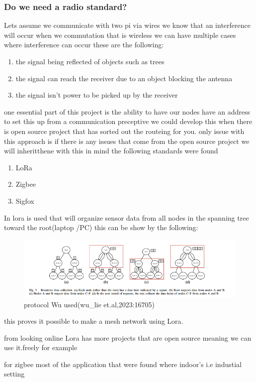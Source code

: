 \subsubsection{Do we need a radio standard?}
Lets assume we communicate with two pi via wires  we know that an interference will occur when  we  commutation that is wireless
we can have multiple cases where interference can  occur these are  the following:
\begin{enumerate}
    \item the signal being reflected of objects such as  trees
    \item the signal can reach the  receiver due to an object blocking the antenna
    \item the signal isn't  power to be picked up by the receiver
\end{enumerate}
one essential part of this project is the  ability to have  our nodes have an address to set this up
from a communication preceptive we could develop this when there is open source project that has sorted out the routeing for  you.
only issue with this approach is if there is any issues that come from the open source project we will inheritthene
with this in mind the following standards were found
\begin{enumerate}
    \item LoRa
    \item Zigbee
    \item Sigfox
\end{enumerate}
In \cite{Wu_Liebeherr_2023} lora is used  that will organize sensor
data from all nodes in the spanning tree toward the root(laptop /PC) this can be show by the  following:
\begin{figure}[h!]
    \centering
    \includegraphics[width=0.5\linewidth]{Images/lora_example_routing_proto.png}
    \caption{protocol Wu used(wu\_lie et.al,2023:16705)}
    \label{protocol Wu used(wu_lie et.al,2023:16705)}
\end{figure}  
this proves it possible  to make a  mesh network using Lora.
\par 
from looking online Lora has more projects that are open source meaning we can use it.freely for example 
\par
for zigbee most of the application  that were found where indoor's i.e industial setting
  